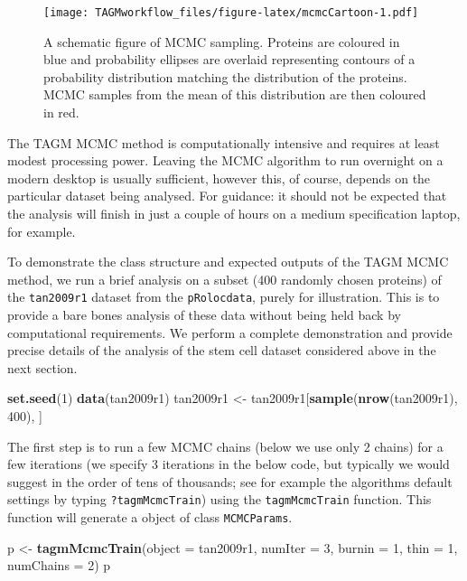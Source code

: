 \documentclass[]{article}
\newenvironment{Shaded}{\begin{snugshade}}{\end{snugshade}}
\newcommand{\KeywordTok}[1]{\textcolor[rgb]{0.13,0.29,0.53}{\textbf{{#1}}}}
\newcommand{\DataTypeTok}[1]{\textcolor[rgb]{0.13,0.29,0.53}{{#1}}}
\newcommand{\DecValTok}[1]{\textcolor[rgb]{0.00,0.00,0.81}{{#1}}}
\newcommand{\StringTok}[1]{\textcolor[rgb]{0.31,0.60,0.02}{{#1}}}
\newcommand{\NormalTok}[1]{{#1}}
\begin{document}
\begin{figure}[htbp]
\centering
\texttt{[image: TAGMworkflow\_files/figure-latex/mcmcCartoon-1.pdf]}
\caption{\label{fig:mcmcCartoon}A schematic figure of MCMC sampling.
Proteins are coloured in blue and probability ellipses are overlaid
representing contours of a probability distribution matching the
distribution of the proteins. MCMC samples from the mean of this
distribution are then coloured in red.}
\end{figure}

The TAGM MCMC method is computationally intensive and requires at least
modest processing power. Leaving the MCMC algorithm to run overnight on
a modern desktop is usually sufficient, however this, of course, depends
on the particular dataset being analysed. For guidance: it should not be
expected that the analysis will finish in just a couple of hours on a
medium specification laptop, for example.

To demonstrate the class structure and expected outputs of the TAGM MCMC
method, we run a brief analysis on a subset (400 randomly chosen
proteins) of the \texttt{tan2009r1} dataset from the
\texttt{pRolocdata}, purely for illustration. This is to provide a bare
bones analysis of these data without being held back by computational
requirements. We perform a complete demonstration and provide precise
details of the analysis of the stem cell dataset considered above in the
next section.

\begin{Shaded}
\begin{Highlighting}[]
\KeywordTok{set.seed}\NormalTok{(}\DecValTok{1}\NormalTok{)}
\KeywordTok{data}\NormalTok{(tan2009r1)}
\NormalTok{tan2009r1 <-}\StringTok{ }\NormalTok{tan2009r1[}\KeywordTok{sample}\NormalTok{(}\KeywordTok{nrow}\NormalTok{(tan2009r1), }\DecValTok{400}\NormalTok{), ]}
\end{Highlighting}
\end{Shaded}

The first step is to run a few MCMC chains (below we use only 2 chains)
for a few iterations (we specify 3 iterations in the below code, but
typically we would suggest in the order of tens of thousands; see for
example the algorithms default settings by typing
\texttt{?tagmMcmcTrain}) using the \texttt{tagmMcmcTrain} function. This
function will generate a object of class \texttt{MCMCParams}.

\begin{Shaded}
\begin{Highlighting}[]
\NormalTok{p <-}\StringTok{ }\KeywordTok{tagmMcmcTrain}\NormalTok{(}\DataTypeTok{object =} \NormalTok{tan2009r1, }\DataTypeTok{numIter =} \DecValTok{3}\NormalTok{,}
                   \DataTypeTok{burnin =} \DecValTok{1}\NormalTok{, }\DataTypeTok{thin =} \DecValTok{1}\NormalTok{, }\DataTypeTok{numChains =} \DecValTok{2}\NormalTok{)}
\NormalTok{p}
\end{Highlighting}
\end{Shaded}
\end{document}
